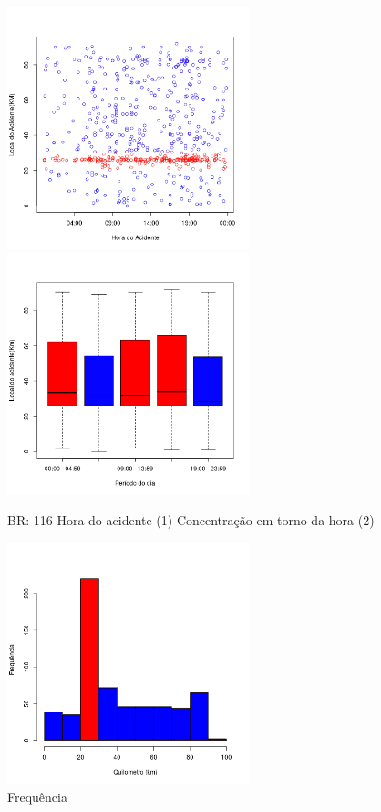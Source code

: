 \begin{figure}[h]
	\caption{BR: 116 Hora do acidente (1) Concentração em torno da hora (2)}
	\includegraphics[width=7cm,height=7cm]{Figuras/Preprocess/br116_1.png}
	\includegraphics[width=7cm,height=7cm]{Figuras/Preprocess/br116_2.png}

\end{figure}

\quad \quad
\begin{figure}[h]
	\centering
	\caption{ Frequência}
	\includegraphics[width=7cm,height=7cm]{Figuras/Preprocess/br116_3.png}
\end{figure}


